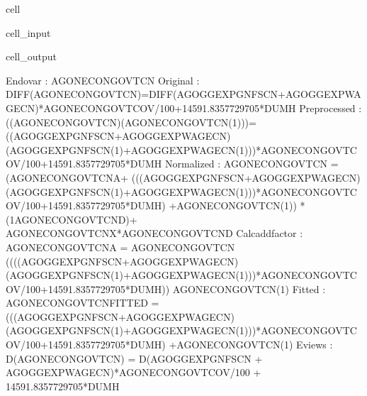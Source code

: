 \documentclass[letterpaper,10pt,english]{jupyterBook}
\begin{document}
\begin{sphinxuseclass}{cell}\begin{sphinxVerbatimInput}

\begin{sphinxuseclass}{cell_input}
\begin{sphinxVerbatim}[commandchars=\\\{\}]
\PYG{p}{[}\PYG{p}{]}\PYG{p}{[}\PYG{p}{]}
\end{sphinxVerbatim}

\end{sphinxuseclass}\end{sphinxVerbatimInput}
\begin{sphinxVerbatimOutput}

\begin{sphinxuseclass}{cell_output}
\begin{sphinxVerbatim}[commandchars=\\\{\}]
Endo\PYGZus{}var        : AGONECONGOVTCN
Original        : DIFF(AGONECONGOVTCN)=DIFF(AGOGGEXPGNFSCN+AGOGGEXPWAGECN)*AGONECONGOVTCOV\PYGZus{}/100+14591.8357729705*DUMH
Preprocessed    : ((AGONECONGOVTCN)\PYGZhy{}(AGONECONGOVTCN(\PYGZhy{}1)))=((AGOGGEXPGNFSCN+AGOGGEXPWAGECN)\PYGZhy{}(AGOGGEXPGNFSCN(\PYGZhy{}1)+AGOGGEXPWAGECN(\PYGZhy{}1)))*AGONECONGOVTCOV\PYGZus{}/100+14591.8357729705*DUMH
Normalized      : AGONECONGOVTCN = (AGONECONGOVTCN\PYGZus{}A+ (((AGOGGEXPGNFSCN+AGOGGEXPWAGECN)\PYGZhy{}(AGOGGEXPGNFSCN(\PYGZhy{}1)+AGOGGEXPWAGECN(\PYGZhy{}1)))*AGONECONGOVTCOV\PYGZus{}/100+14591.8357729705*DUMH) +AGONECONGOVTCN(\PYGZhy{}1)) * (1\PYGZhy{}AGONECONGOVTCN\PYGZus{}D)+ AGONECONGOVTCN\PYGZus{}X*AGONECONGOVTCN\PYGZus{}D 
Calc\PYGZus{}add\PYGZus{}factor : AGONECONGOVTCN\PYGZus{}A = AGONECONGOVTCN\PYGZhy{} ((((AGOGGEXPGNFSCN+AGOGGEXPWAGECN)\PYGZhy{}(AGOGGEXPGNFSCN(\PYGZhy{}1)+AGOGGEXPWAGECN(\PYGZhy{}1)))*AGONECONGOVTCOV\PYGZus{}/100+14591.8357729705*DUMH)) \PYGZhy{}AGONECONGOVTCN(\PYGZhy{}1)
Fitted          : AGONECONGOVTCN\PYGZus{}FITTED =  (((AGOGGEXPGNFSCN+AGOGGEXPWAGECN)\PYGZhy{}(AGOGGEXPGNFSCN(\PYGZhy{}1)+AGOGGEXPWAGECN(\PYGZhy{}1)))*AGONECONGOVTCOV\PYGZus{}/100+14591.8357729705*DUMH) +AGONECONGOVTCN(\PYGZhy{}1)
Eviews          : D(AGONECONGOVTCN) = D(AGOGGEXPGNFSCN + AGOGGEXPWAGECN)*AGONECONGOVTCOV\PYGZus{}/100 + 14591.8357729705*DUMH
\end{sphinxVerbatim}

\begin{sphinxVerbatim}[commandchars=\\\{\}]

\end{sphinxVerbatim}

\end{sphinxuseclass}\end{sphinxVerbatimOutput}

\end{sphinxuseclass}
\end{document}
